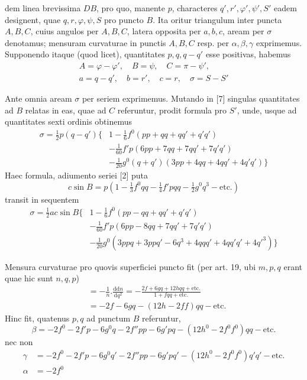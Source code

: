 %
dem linea brevissima \(DB\), pro quo, manente \(p\), characteres \(q',r',\varphi',\psi',S'\) eadem designent, quae \(q,r,\varphi,\psi,S\) pro puncto \(B\). Ita oritur triangulum inter puncta \(A,B,C\), cuius angulos per \(A,B,C\), latera opposita per \(a,b,c\), aream per \(\sigma\) denotamus; mensuram curvaturae in punctis \(A,B,C\) resp. per \(\alpha,\beta,\gamma\) exprimemus. Supponendo itaque (quod licet), quantitates \(p,q,q-q'\) esse positivas, habemus
\[
\begin{gathered}
A=\varphi-\varphi',\quad B=\psi,\quad C=\pi-\psi',\\
a=q-q',\quad b=r',\quad c=r,\quad\sigma=S-S'
\end{gathered}
\]

Ante omnia aream \(\sigma\) per seriem exprimemus. Mutando in [7] singulas quantitates ad \(B\) relatas in eas, quae ad \(C\) referuntur, prodit formula pro \(S'\), unde, usque ad quantitates sexti ordinis obtinemus
\[
\begin{aligned}
\sigma=\tfrac{1}{2}p(q-q')\{&1-\tfrac{1}{6}f^0(pp+qq+qq'+q'q')\\
&-\tfrac{1}{60}f'p(6pp+7qq+7qq'+7q'q')\\
&-\tfrac{1}{20}g^0(q+q')(3pp+4qq+4qq'+4q'q')\}
\end{aligned}
\]
Haec formula, adiumento seriei [2] puta
\[
c\sin B=p(1-\tfrac{1}{3}f^0qq-\tfrac{1}{4}f'pqq-\tfrac{1}{2}g^0q^3-\text{etc.})
\]
transit in sequentem
\[
\begin{aligned}
\sigma=\tfrac{1}{2}ac\sin B\{&1-\tfrac{1}{6}f^0(pp-qq+qq'+q'q')\\
&-\tfrac{1}{60}f'p(6pp-8qq+7qq'+7q'q')\\
&-\tfrac{1}{20}g^0(3ppq+3ppq'-6q^3+4qqq'+4qq'q'+4q'^3)\}
\end{aligned}
\]

Mensura curvaturae pro quovis superficiei puncto fit (per art. 19, ubi \(m,p,q\) erant quae hic sunt \(n,q,p\))
\[
\begin{aligned}
&=-\frac{1}{n}\mathord{.}\frac{\mathrm{d}\mathrm{d}n}{\mathrm{d}q^2}=-\frac{2f+6gq+12hqq+\text{etc.}}{1+fqq+\text{etc.}}\\
&=-2f-6gq-(12h-2ff)qq-\text{etc.}
\end{aligned}
\]
Hinc fit, quatenus \(p,q\) ad punctum \(B\) referuntur,
\[
\beta=-2f^0-2f'p-6g^0q-2f''pp-6g'pq-(12h^0-2f^0f^0)qq-\text{etc.}
\]
nec non
\[
\begin{aligned}
\gamma&=-2f^0-2f'p-6g^0q'-2f''pp-6g'pq'-(12h^0-2f^0f^0)q'q'-\text{etc.}\\
\alpha&=-2f^0
\end{aligned}
\]
